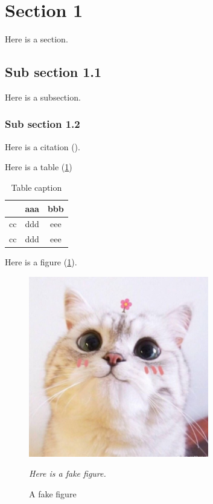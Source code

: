\section{Section 1}

Here is a section.

\subsection{Sub section 1.1}

Here is a subsection.

\subsubsection{Sub section 1.2}

Here is a citation (\cite{Stehelin:1976dg}).

Here is a table (\ref{tb:first_table})

\begin{table}[hbt!]
    \centering
    \begin{tabular}{ c | c   c } 
        \hline
         & aaa & bbb \\
        \hline
        cc & ddd & eee \\
        cc & ddd & eee \\ 
        \hline
    \end{tabular}
    \caption{Table caption}
    \label{tb:first_table}
\end{table}

Here is a figure (\ref{fig:fake}).

\begin{figure}[hbt!]
    \centering
    \includegraphics[width=0.7\textwidth]{images/fakefig.JPG}
    \caption{A fake figure}
    \label{fig:fake}

    \smallskip
    \small
    \justify
    \textsl{Here is a fake figure.}

\end{figure}